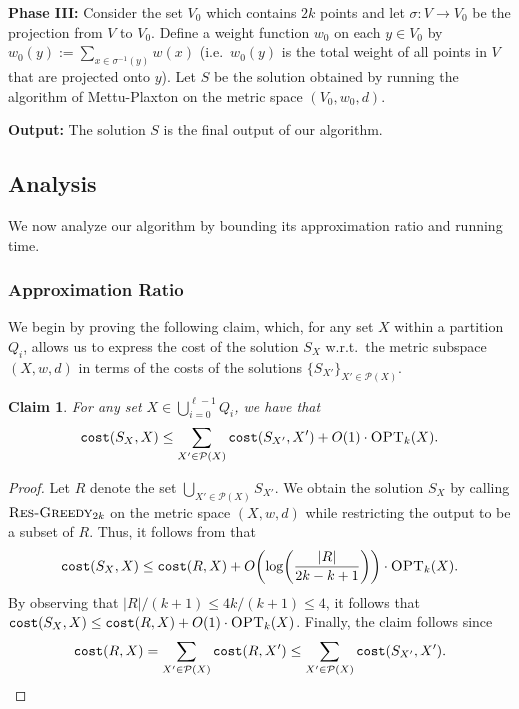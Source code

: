 \documentclass[11pt]{article}
\newcommand{\1}{\mathmybb{1}}
\newtheorem{claim}[theorem]{Claim}
\newcommand{\OPT}{\textsc{OPT}}
\newcommand{\cost}{\textnormal{\texttt{cost}}}
\newcommand{\Restr}{\textnormal{\textsc{Res-Greedy}}}
\begin{document}
\medskip
\noindent
\textbf{Phase III:} Consider the set $V_0$
which contains $2k$ points and let $\sigma : V \longrightarrow V_0$ be the projection from $V$ to $V_0$. Define a weight function $w_0$ on each $y \in V_0$ by $w_0(y) := \sum_{x \in \sigma^{-1}(y)} w(x)$ (i.e.~$w_0(y)$ is the total weight of all points in $V$ that are projected onto $y$). Let $S$ be the solution obtained by running the algorithm of Mettu-Plaxton \cite{MettuP00} on the metric space $(V_0, w_0, d)$.

\medskip
\noindent
\textbf{Output:}
The solution $S$ is the final output of our algorithm.

\subsection{Analysis}\label{sec:anal:ouralg}

We now analyze our algorithm by bounding its approximation ratio and running time.

\subsubsection*{Approximation Ratio}

We begin by proving the following claim, which, for any set $X$ within a partition $Q_i$, allows us to express the cost of the solution $S_X$ w.r.t.~the metric subspace $(X,w,d)$ in terms of the costs of the solutions $\{S_{X'}\}_{X' \in \mathcal P(X)}$. 

\begin{claim}\label{lem:apx:1}
For any set $X \in \bigcup_{i=0}^{\ell - 1} Q_i$, we have that
$$ \cost(S_X, X) \leq \sum_{X' \in \mathcal P(X)} \cost(S_{X'}, X') + O(1) \cdot \OPT_k(X). $$
\end{claim}

\begin{proof}
    Let $R$ denote the set $\bigcup_{X' \in \mathcal P(X)} S_{X'}$. We obtain the solution $S_X$ by calling $\Restr_{2k}$ on the metric space $(X,w,d)$ while restricting the output to be a subset of  $R$. Thus, it follows from  that
    \begin{equation*}\label{eq:apx:1}
        \cost(S_X, X) \leq \cost(R, X) + O \!\left( \log \! \left(\frac{|R|}{2k - k + 1} \right)\right) \cdot \OPT_k(X).
    \end{equation*}
    By observing that $|R|/(k+1) \leq 4k / (k + 1) \leq 4$,
    it follows that $\cost(S_X, X) \leq \cost(R, X) + O(1) \cdot \OPT_k(X)$.
    Finally, the claim follows since
    $$ \cost(R,X) = \sum_{X' \in \mathcal P(X)} \cost(R, X') \leq \sum_{X' \in \mathcal P(X)} \cost(S_{X'}, X').\qedhere $$
\end{proof}
\end{document}
